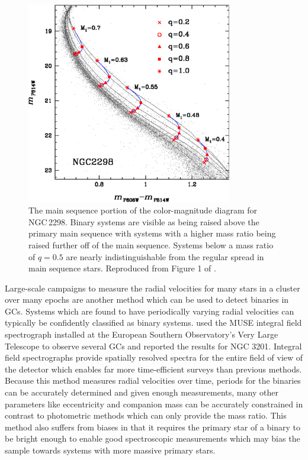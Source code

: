 \begin{figure}
	\centering
	\includegraphics[width=0.8\textwidth]{"./figures/main_sequence_binaries.pdf"}
	\caption{The main sequence portion of the color-magnitude diagram for NGC\,2298. Binary
		systems are visible as being raised above the primary main sequence with systems with a
		higher mass ratio being raised further off of the main sequence. Systems below a mass ratio
		of $q=0.5$ are nearly indistinguishable from the regular spread in main sequence stars.
		Reproduced from Figure 1 of \citet{Milone2012}.}
	\label{fig:1/main_sequence_binaries}
\end{figure}


Large-scale campaigns to measure the radial velocities for many stars in a cluster over many epochs
are another method which can be used to detect binaries in GCs. Systems which are found to have
periodically varying radial velocities can typically be confidently classified as binary systems.
\citet{Giesers2019} used the MUSE integral field spectrograph installed at the European Southern
Observatory's Very Large Telescope to observe several GCs and reported the results for NGC 3201.
Integral field spectrographs provide spatially resolved spectra for the entire field of view of the
detector which enables far more time-efficient surveys than previous methods. Because this method
measures radial velocities over time, periods for the binaries can be accurately determined and
given enough measurements, many other parameters like eccentricity and companion mass can be
accurately constrained in contrast to photometric methods which can only provide the mass ratio.
This method also suffers from biases in that it requires the primary star of a binary to be bright
enough to enable good spectroscopic measurements which may bias the sample towards systems with more
massive primary stars.



